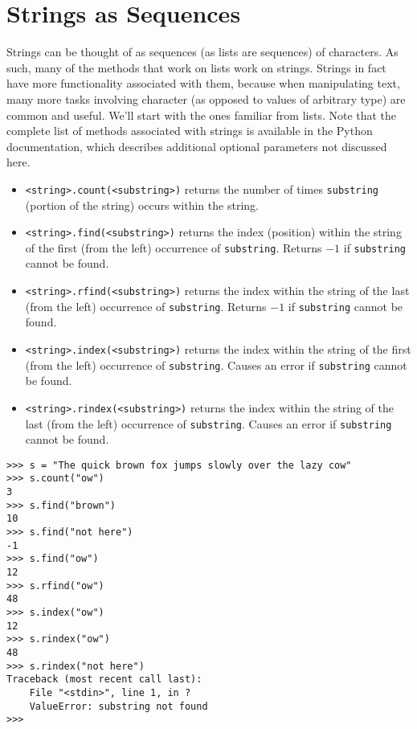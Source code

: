 \section{Strings as Sequences}

Strings can be thought of as sequences (as lists are sequences) of   characters. As such, many of the methods that work on lists work on   strings. Strings in fact have more functionality associated with them,   because when manipulating text, many more tasks   involving character (as opposed to values of arbitrary type) are common   and useful. We'll start with the ones familiar from lists. Note that   the complete list of methods associated with strings is available in the Python   documentation, which describes additional optional parameters not   discussed here.
\begin{itemize}
	\item 
\texttt{<string>.count(<substring>)} returns    the number of times \texttt{substring} (portion of the string) occurs within the string.
	\item 
\texttt{<string>.find(<substring>)} returns the    index (position) within the string of the first (from the left) occurrence of    \texttt{substring}. Returns $-1$ if \texttt{substring} cannot be found.
	\item 
\texttt{<string>.rfind(<substring>)} returns    the index within the string of the last (from the left) occurrence    of \texttt{substring}. Returns $-1$ if \texttt{substring} cannot be found.
	\item 
\texttt{<string>.index(<substring>)} returns    the index within the string of the first (from the left) occurrence    of \texttt{substring}. Causes an error if \texttt{substring} cannot be found.
	\item 
\texttt{<string>.rindex(<substring>)} returns    the index within the string of the last (from the left) occurrence    of \texttt{substring}. Causes an error if \texttt{substring} cannot be found.
\end{itemize}
\lstset{keywordstyle=\ttfamily}
\begin{lstlisting}
>>> s = "The quick brown fox jumps slowly over the lazy cow"
>>> s.count("ow")
3
>>> s.find("brown")
10
>>> s.find("not here")
-1
>>> s.find("ow")
12
>>> s.rfind("ow")
48
>>> s.index("ow")
12
>>> s.rindex("ow")
48
>>> s.rindex("not here")
Traceback (most recent call last):
    File "<stdin>", line 1, in ?
    ValueError: substring not found
>>>
\end{lstlisting}
\lstset{keywordstyle=\textbf}
